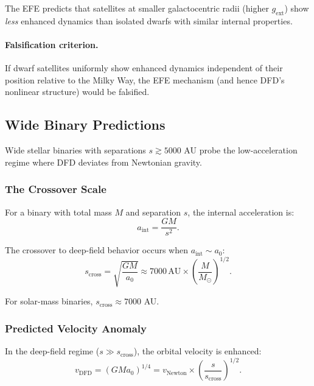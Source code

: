 The EFE predicts that satellites at smaller galactocentric radii (higher 
$g_{\mathrm{ext}}$) show \emph{less} enhanced dynamics than isolated dwarfs 
with similar internal properties.

\paragraph{Falsification criterion.}
If dwarf satellites uniformly show enhanced dynamics independent of their 
position relative to the Milky Way, the EFE mechanism (and hence DFD's 
nonlinear structure) would be falsified.

\subsection{Wide Binary Predictions}\label{app:wide-binaries}

Wide stellar binaries with separations $s \gtrsim 5000$ AU probe the 
low-acceleration regime where DFD deviates from Newtonian gravity.

\subsubsection{The Crossover Scale}

For a binary with total mass $M$ and separation $s$, the internal acceleration is:
\begin{equation}
a_{\mathrm{int}} = \frac{GM}{s^2}.
\end{equation}

The crossover to deep-field behavior occurs when $a_{\mathrm{int}} \sim a_0$:
\begin{equation}
s_{\mathrm{cross}} = \sqrt{\frac{GM}{a_0}} \approx 7000\,\mathrm{AU} \times \left(\frac{M}{M_\odot}\right)^{1/2}.
\end{equation}

For solar-mass binaries, $s_{\mathrm{cross}} \approx 7000$ AU.

\subsubsection{Predicted Velocity Anomaly}

In the deep-field regime ($s \gg s_{\mathrm{cross}}$), the orbital velocity is enhanced:
\begin{equation}
v_{\mathrm{DFD}} = (GMa_0)^{1/4} = v_{\mathrm{Newton}} \times \left(\frac{s}{s_{\mathrm{cross}}}\right)^{1/2}.
\end{equation}


